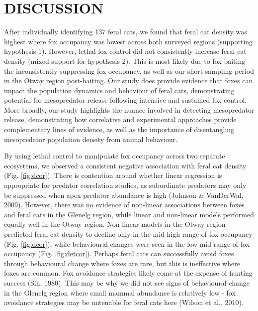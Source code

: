 \documentclass[]{elsarticle} %
\begin{document}
\newpage

\hypertarget{discussion}{%
\section{DISCUSSION}\label{discussion}}

After individually identifying 137 feral cats, we found that feral cat density was highest where fox occupancy was lowest across both surveyed regions (supporting hypothesis 1). However, lethal fox control did not consistently increase feral cat density (mixed support for hypothesis 2). This is most likely due to fox-baiting the inconsistently suppressing fox occupancy, as well as our short sampling period in the Otway region post-baiting. Our study does provide evidence that foxes can impact the population dynamics and behaviour of feral cats, demonstrating potential for mesopredator release following intensive and sustained fox control. More broadly, our study highlights the nuance involved in detecting mesopredator release, demonstrating how correlative and experimental approaches provide complementary lines of evidence, as well as the importance of disentangling mesopredator population density from animal behaviour.

By using lethal control to manipulate fox occupancy across two separate ecosystems, we observed a consistent negative association with feral cat density (Fig. \ref{fig:dcor}). There is contention around whether linear regression is appropriate for predator correlation studies, as subordinate predators may only be suppressed when apex predator abundance is high (Johnson \& VanDerWal, 2009). However, there was no evidence of non-linear associations between foxes and feral cats in the Glenelg region, while linear and non-linear models performed equally well in the Otway region. Non-linear models in the Otway region predicted feral cat density to decline only in the mid-high range of fox occupancy (Fig. \ref{fig:dcor}), while behavioural changes were seen in the low-mid range of fox occupancy (Fig. \ref{fig:detcor}). Perhaps feral cats can successfully avoid foxes through behavioural change where foxes are rare, but this is ineffective where foxes are common. Fox avoidance strategies likely come at the expense of hunting success (Sih, 1980). This may be why we did not see signs of behavioural change in the Glenelg region where small mammal abundance is relatively low - fox avoidance strategies may be untenable for feral cats here (Wilson et al., 2010).
\end{document}
